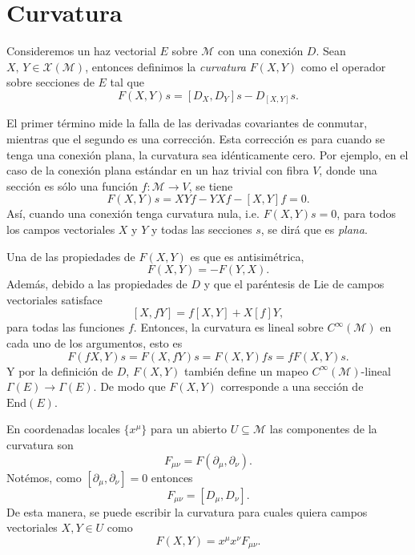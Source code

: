 \section{Curvatura}

Consideremos un haz vectorial $E$ sobre $\mathcal{M}$ con una conexi\'{o}n $D$. Sean $X, \, Y \in \mathcal{X(M)}$, entonces definimos la \emph{curvatura} $F(X,Y)$ como el operador sobre secciones de $E$ tal que
%
\begin{equation}
F(X,Y)s = [D_{X}, D_{Y}]s - D_{[X,Y]}s.
\end{equation}

El primer t\'{e}rmino mide la falla de las derivadas covariantes de conmutar, mientras que el segundo es una correcci\'{o}n. Esta correcci\'{o}n es para cuando se tenga una conexi\'{o}n plana, la curvatura sea id\'{e}nticamente cero. Por ejemplo, en el caso de la conexi\'{o}n plana est\'{a}ndar en un haz trivial con fibra $V$, donde una secci\'{o}n es s\'{o}lo una funci\'{o}n $f:\mathcal{M} \rightarrow V$, se tiene
%
\begin{equation}
F(X,Y)s = XYf - YXf - [X,Y]f = 0.
\end{equation}
% 
As\'{i}, cuando una conexi\'{o}n tenga curvatura nula, i.e. $F(X,Y)s = 0$, para todos los campos vectoriales $X$ y $Y$ y todas las secciones $s$, se dir\'{a} que es \emph{plana}.

Una de las propiedades de $F(X,Y)$ es que es antisim\'{e}trica, $$F(X,Y) = -F(Y,X).$$ Adem\'{a}s, debido a las propiedades de $D$ y que el par\'{e}ntesis de Lie de campos vectoriales satisface $$[X,fY] = f[X,Y] + X[f]Y,$$ para todas las funciones $f$. Entonces, la curvatura es lineal sobre $C^{\infty}(\mathcal{M})$ en cada uno de los argumentos, esto es
%
\begin{equation*}
F(fX,Y)s = F(X, fY)s = F(X,Y)fs = fF(X,Y)s.
\end{equation*}
%
Y por la definici\'{o}n de $D$, $F(X,Y)$ tambi\'{e}n define un mapeo $C^{\infty}(\mathcal{M})$-lineal $\Gamma(E) \rightarrow \Gamma(E)$. De modo que $F(X,Y)$ corresponde a una secci\'{o}n de $\mathrm{End}(E)$.

En coordenadas locales $\{x^{\mu}\}$ para un abierto $U \subseteq \mathcal{M}$ las componentes de la curvatura son
%
\begin{equation}
F_{\mu \nu} = F(\partial_{\mu}, \partial_{\nu}).
\end{equation}
%
Not\'{e}mos, como $[\partial_{\mu}, \partial_{\nu}] = 0$ entonces
%
\begin{equation}
F_{\mu \nu} = [D_{\mu}, D_{\nu}].
\end{equation}
%
De esta manera, se puede escribir la curvatura para cuales quiera campos vectoriales $X, Y \in U$ como
%
\begin{equation}
F(X,Y) = x^{\mu} x^{\nu} F_{\mu \nu}.
\end{equation}

